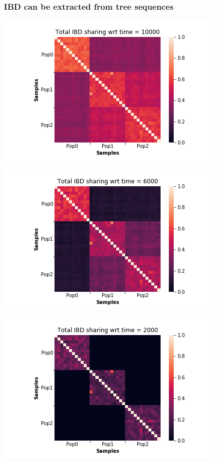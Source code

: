 \documentclass[11pt, mathserif, aspectratio=169]{beamer}
\begin{document}
\begin{frame}
\frametitle{IBD can be extracted from tree sequences}
\begin{minipage}{.75\linewidth}


\vspace{5mm}

\begin{minipage}{.33\linewidth}
\includegraphics[scale=.2]{pics/kinships-10000.png}
\end{minipage}\begin{minipage}{.33\linewidth}
\includegraphics[scale=.2]{pics/kinships-6000.png}
\end{minipage}\begin{minipage}{.33\linewidth}
\includegraphics[scale=.2]{pics/kinships-2000.png}
\end{minipage}


\end{minipage}
\end{frame}
\end{document}
